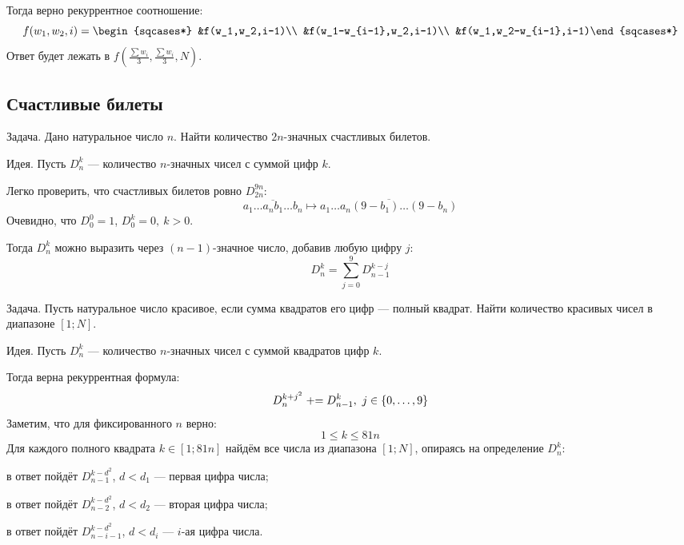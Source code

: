 Тогда верно рекуррентное соотношение:
$$f(w_1,w_2,i)=\begin{sqcases*}
&f(w_1,w_2,i-1)\\
&f(w_1-w_{i-1},w_2,i-1)\\
&f(w_1,w_2-w_{i-1},i-1)\end{sqcases*}$$
Ответ будет лежать в $f(\frac{\sum w_i}{3},\frac{\sum w_i}{3},N)$.

\newpage
\subsection{Счастливые билеты}

\begin{theorem}
{\bold Задача.} Дано натуральное число $n$. Найти количество $2n$-значных счастливых билетов.
\end{theorem}

{\bold Идея.} Пусть $D_n^k$ --- количество $n$-значных чисел с суммой цифр $k$.

Легко проверить, что счастливых билетов ровно $D_{2n}^{9n}$:
$$\overline{a_1\dots a_nb_1\dots b_n}\mapsto\overline{a_1\dots a_n(9-b_1)\dots(9-b_n)}$$
Очевидно, что $D_0^0=1$, $D_0^{k}=0,\ k\greater 0$.

Тогда $D_n^k$ можно выразить через $(n-1)$-значное число, добавив любую цифру $j$:
$$D_n^k=\sum_{j=0}^9D_{n-1}^{k-j}$$
\begin{theorem}
{\bold Задача.} Пусть натуральное число {\ital красивое}, если сумма квадратов его цифр --- полный квадрат. Найти количество красивых чисел в диапазоне $[1;N]$.
\end{theorem}

{\bold Идея.} Пусть $D_n^k$ --- количество $n$-значных чисел с суммой квадратов цифр $k$.

Тогда верна рекуррентная формула:
$$D_{n}^{k+j^2}\pluseq D_{n-1}^k,\ j\in\{0,\dots,9\}$$
Заметим, что для фиксированного $n$ верно:
$$1\leq k\leq 81n$$
Для каждого {\ital полного квадрата} $k\in[1;81n]$ найдём все числа из диапазона $[1;N]$, опираясь на определение $D_n^k$:
\begin{list*}
\item в ответ пойдёт $D_{n-1}^{k-d^2}$, $d\less d_1$ --- первая цифра числа;
\item в ответ пойдёт $D_{n-2}^{k-d^2}$, $d\less d_2$ --- вторая цифра числа;
\item в ответ пойдёт $D_{n-i-1}^{k-d^2}$, $d\less d_i$ --- $i$-ая цифра числа.
\end{list*}

